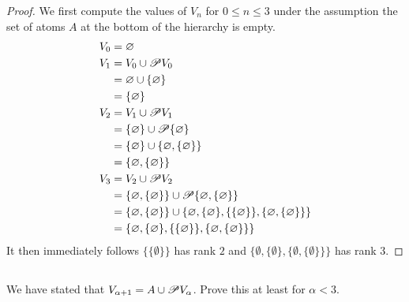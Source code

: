 \documentclass{report}
\begin{document}
  \begin{proof}
    We first compute the values of $V_n$ for $0 \leq n \leq 3$ under the
      assumption the set of atoms $A$ at the bottom of the hierarchy is empty.
    \begin{align*}
      V_0 & = \varnothing \\
      V_1 & = V_0 \cup \mathscr{P}V_0 \\
          & = \varnothing \cup \{\varnothing\} \\
          & = \{\varnothing\} \\
      V_2 & = V_1 \cup \mathscr{P}V_1 \\
          & = \{\varnothing\} \cup \mathscr{P}\{\varnothing\} \\
          & = \{\varnothing\} \cup \{\varnothing, \{\varnothing\}\} \\
          & = \{\varnothing, \{\varnothing\}\} \\
      V_3 & = V_2 \cup \mathscr{P}V_2 \\
          & = \{\varnothing, \{\varnothing\}\} \cup
              \mathscr{P}\{\varnothing, \{\varnothing\}\} \\
          & = \{\varnothing, \{\varnothing\}\} \cup
              \{\varnothing,
                \{\varnothing\},
                \{\{\varnothing\}\},
                \{\varnothing, \{\varnothing\}\}\} \\
          & = \{\varnothing,
                \{\varnothing\},
                \{\{\varnothing\}\},
                \{\varnothing, \{\varnothing\}\}\}
    \end{align*}
    It then immediately follows $\{\{\emptyset\}\}$ has rank $2$ and
      $\{\emptyset, \{\emptyset\}, \{\emptyset, \{\emptyset\}\}\}$ has rank $3$.
  \end{proof}

\subsection{}%

  We have stated that $V_{\alpha + 1} = A \cup \mathscr{P}V_\alpha$.
  Prove this at least for $\alpha < 3$.
\end{document}
